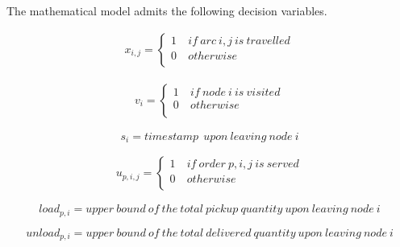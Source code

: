 \clearpage
The mathematical model admits the following decision variables.

\begin{equation}
   \begin{split}
   x_{i,j}=\left\{
                \begin{array}{ll}
                  1\ & if\ arc\ i,j\ is\ travelled\\
                  0 & otherwise\\
                \end{array}
              \right.
   \end{split}
\end{equation}

\begin{equation}
   \begin{split}
   v_i=\left\{
                \begin{array}{ll}
                  1\ & if\ node\ i\ is\ visited\\
                  0 & otherwise\\
                \end{array}
              \right.
   \end{split}
\end{equation}

\begin{equation}
   s_i=timestamp\ \ upon\ leaving\ node\ i
\end{equation}

\begin{equation}
   \begin{split}
   u_{p,i,j}=\left\{
                \begin{array}{ll}
                  1\ & if\ order\ p,i,j\ is\ served\\
                  0 & otherwise\\
                \end{array}
              \right.
   \end{split}
\end{equation}

\begin{equation}
   {load}_{p,i}=upper\ bound\ of\ the\ total\ pickup\ quantity\ upon\ leaving\ node\ i
\end{equation}

\begin{equation}
   {unload}_{p,i}=upper\ bound\ of\ the\ total\ delivered\ quantity\ upon\ leaving\ node\ i
\end{equation}

